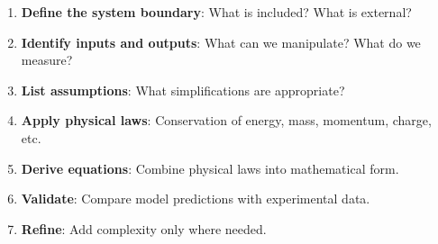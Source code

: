 \begin{enumerate}
    \item \textbf{Define the system boundary}: What is included? What is external?

    \item \textbf{Identify inputs and outputs}: What can we manipulate? What do we measure?

    \item \textbf{List assumptions}: What simplifications are appropriate?

    \item \textbf{Apply physical laws}: Conservation of energy, mass, momentum, charge, etc.

    \item \textbf{Derive equations}: Combine physical laws into mathematical form.

    \item \textbf{Validate}: Compare model predictions with experimental data.

    \item \textbf{Refine}: Add complexity only where needed.
\end{enumerate}

